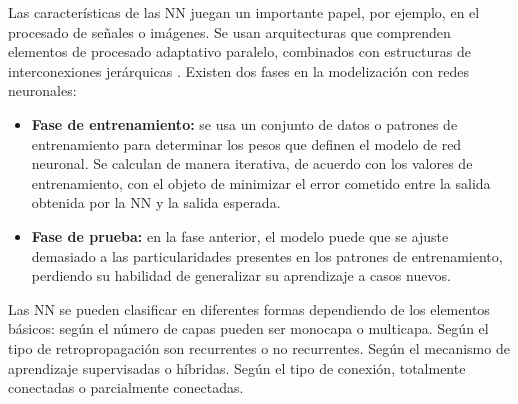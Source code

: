 \documentclass[12pt,letterpaper,oneside,openright]{book}
\begin{document}
 	Las características de las NN juegan un importante papel, por ejemplo, en el procesado de señales o imágenes. Se usan arquitecturas que comprenden elementos de procesado adaptativo paralelo, combinados con estructuras de interconexiones jerárquicas \cite{percepMulti}. Existen dos fases en la modelización con redes neuronales:
 	\begin{itemize}
 		\item \textbf{Fase de entrenamiento:} se usa un conjunto de datos o patrones de entrenamiento para determinar los pesos que definen el modelo de red neuronal. Se calculan de manera iterativa, de acuerdo con los valores de entrenamiento, con el objeto de minimizar el error cometido entre la salida obtenida por la NN y la salida esperada.
 		\item \textbf{Fase de prueba:} en la fase anterior, el modelo puede que se ajuste demasiado a las particularidades presentes en los patrones de entrenamiento, perdiendo su habilidad de generalizar su aprendizaje a casos nuevos.
 	\end{itemize}
 	
 	Las NN se pueden clasificar en diferentes formas dependiendo de los elementos básicos: según el número de capas pueden ser monocapa o multicapa. Según el tipo de retropropagación son recurrentes o no recurrentes. Según el mecanismo de aprendizaje supervisadas o híbridas. Según el tipo de conexión, totalmente conectadas o parcialmente conectadas.
 	
\end{document}
